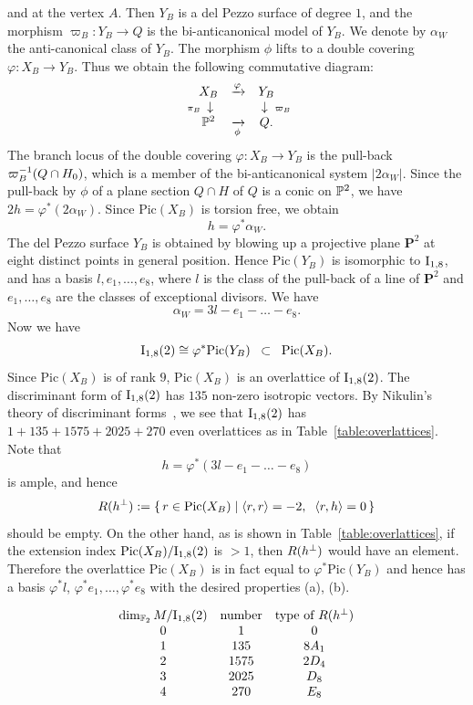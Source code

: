 \documentclass{amsart} %
\newcommand{\ps}{B}
\newcommand{\pips}{\pi_{\ps}}
\newcommand{\Xps}{X_{\ps}}
\newcommand{\Pic}{\mathrm{Pic}}
\newcommand{\bPP}{\mathbf{P}}
\begin{document}
and at the vertex  $A$.
Then $Y_{\ps}$ is a del Pezzo surface of degree $1$,
and the morphism $\varpi_{\ps}\colon Y_{\ps}\to Q$ is the bi-anticanonical model of $Y_{\ps}$.
We denote by $\alpha_W$ the anti-canonical class of $Y_{\ps}$. 
The morphism $\phi$  lifts to a double covering $\varphi\colon \Xps\to Y_{\ps}$.
Thus we obtain  the following commutative diagram:
 \[
 \begin{array}{ccc}
 \Xps &\xrightarrow{\varphi}  & Y_{\ps} \\
 \llap{$\scriptstyle{\pips}\; $}\downarrow & & \downarrow \rlap{$\; \scriptstyle{\varpi_{\ps}}$} \\
\PP^2 &\xrightarrow[\phi]{}  & Q.
 \end{array}
 \]
The branch locus of 
the  double covering  $\varphi\colon \Xps\to Y_{\ps}$ is 
the pull-back $ \varpi_{\ps}\inv (Q\cap H_0)$,
which is a member of the bi-anticanonical system $|2 \alpha_W|$.
Since the pull-back by $\phi$ of a plane section $Q\cap H$  of $Q$ is a conic
on $\mathord{\mathbb{P}}^2$,
we have $2h=\varphi^*(2\alpha_W)$.
Since $\Pic(X_{\ps})$ is torsion free, 
we obtain  
\[
h=\varphi^*\alpha_W.
\]
The del Pezzo surface $Y_{\ps}$ is obtained by 
blowing up a projective plane $\bPP^2$ at eight distinct  points
in general position.
Hence $\Pic(Y_{\ps})$ is isomorphic to $\mathrm{I}_{1, 8}$,
and has a basis $l, e_1, \dots, e_8$,
where $l$ is the class of the pull-back of a line of $\bPP^2$ and 
$e_1, \dots, e_8$ are 
the classes of exceptional divisors.
We have 
\[
\alpha_W=3l-e_1-\dots -e_8.
\]
Now we have
\[
\typeILat_{1, 8}(2)\cong \varphi^* \Pic(Y_{\ps})\;\;\subset\;\; \Pic(X_{\ps}).
\]
Since $\Pic(X_{\ps})$ is of rank $9$,
$\Pic(X_{\ps})$ is an overlattice of $\typeILat_{1, 8}(2)$.
The discriminant form of $\typeILat_{1, 8}(2)$
has $135$ non-zero isotropic vectors.
By Nikulin's theory of discriminant forms~\cite{theNikkulin},
we see that $\typeILat_{1, 8}(2)$  has $1+135+1575+2025+270$ even 
overlattices
as in Table~\ref{table:overlattices}.
Note that 
\[
h=\varphi^*(3l-e_1-\dots -e_8)
\]
is ample, and hence
\[
R(h\sperp):=\set{r\in \Pic(X_{\ps})}{\intf{r, r}=-2, \;\;\intf{r, h}=0}
\]
should be empty.
On the other hand,
as is shown in Table~\ref{table:overlattices}, 
if the extension index $\Pic(X_{\ps})/ \typeILat_{1, 8}(2)$
is $>1$,
then $R(h^{\perp})$ would have an element.
Therefore 
the overlattice $\Pic(X_{\ps})$
is in fact equal to $\varphi^* \Pic(Y_{\ps})$ and hence 
has a basis $\varphi^*l$, $\varphi^*e_1, \dots, \varphi^*e_8$
with the desired properties (a), (b).
%
\begin{table}
\[
\begin{array}{ccc}
\dim_{\mathord{\mathbb{F}}_2} M/\mathrm{I}_{1, 8}(2) &\textrm{number}& \textrm{type of $R(h^{\perp})$}\\
0 &1 & 0\\
1 & 135 & 8 A_1 \\
2 & 1575 &2D_4 \\
3 & 2025 &D_8\\
4 &270 & E_8
\end{array}
\]
\caption{Overlattices $M$ of $\typeILat_{1, 8}(2)$}\label{table:overlattices}
\end{table}
\end{document}
